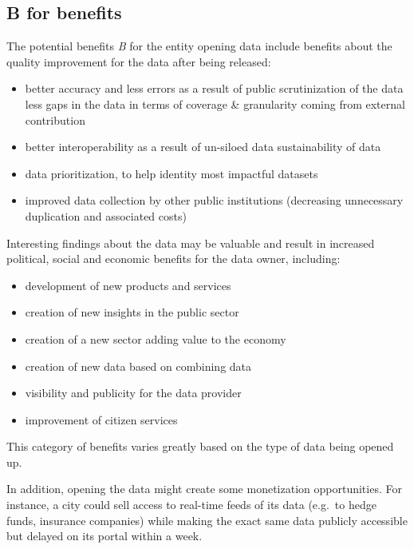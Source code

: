 \documentclass[]{acm_proc_article-sp}
\begin{document}
\subsection{B for benefits}\label{b-for-benefits}

The potential benefits \emph{B} for the entity opening data include
benefits about the quality improvement for the data after being
released: \vspace{0mm}

\begin{itemize}
\itemsep1pt\parskip0pt
\item
  better accuracy and less errors as a result of public scrutinization
  of the data less gaps in the data in terms of coverage \& granularity
  coming from external contribution
\item
  better interoperability as a result of un-siloed data sustainability
  of data
\item
  data prioritization, to help identity most impactful datasets
\item
  improved data collection by other public institutions (decreasing
  unnecessary duplication and associated costs)
\end{itemize}

Interesting findings about the data may be valuable and result in
increased political, social and economic benefits for the data owner,
including: \vspace{0mm}

\begin{itemize}
\itemsep1pt\parskip0pt
\item
  development of new products and services
\item
  creation of new insights in the public sector
\item
  creation of a new sector adding value to the economy
\item
  creation of new data based on combining data
\item
  visibility and publicity for the data provider
\item
  improvement of citizen services
\end{itemize}

This category of benefits varies greatly based on the type of data being
opened up.

In addition, opening the data might create some monetization
opportunities. For instance, a city could sell access to real-time feeds
of its data (e.g.~to hedge funds, insurance companies) while making the
exact same data publicly accessible but delayed on its portal within a
week.
\end{document}
